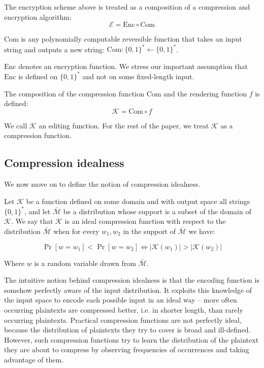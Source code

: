 \documentclass[conference, letterpaper, 10pt]{IEEEtran}
\begin{document}
The encryption scheme above is treated as a composition of a
compression and encryption algorithm:
\begin{equation*}
    \mathcal{E} = \textrm{Enc} \circ \textrm{Com}
\end{equation*}

$\textrm{Com}$ is any polynomially computable reversible function that takes an
input string and outputs a new string: $\textrm{Com}: \{0, 1\}^* \leftarrow \{0,
1\}^*$.

$\textrm{Enc}$ denotes an encryption function. We stress our important
assumption that $\textrm{Enc}$ is defined on $\{0, 1\}^*$ and not on some
fixed-length input.

The composition of the compression function $\textrm{Com}$ and the rendering function $f$
is defined:
\begin{equation*}
    \mathcal{K} = \textrm{Com} \circ f
\end{equation*}

We call $\mathcal{K}$ an editing function. For the rest of the paper, we treat
$\mathcal{K}$ as a compression function.

\subsection{Compression idealness}\label{subsec:com_idealness}

We now move on to define the notion of compression idealness.

Let $\mathcal{K}$ be a function defined on some domain and with output space
all strings $\{0, 1\}^*$, and let $\bar{\mathcal{M}}$ be a distribution whose
support is a subset of the domain of $\mathcal{K}$.  We say that $\mathcal{K}$
is an ideal compression function with respect to the distribution
$\bar{\mathcal{M}}$ when for every $w_1, w_2$ in the support of
$\bar{\mathcal{M}}$ we have:

\begin{equation*}
\Pr[w = w_1] < \Pr[w = w_2] \iff \lvert\mathcal{K}(w_1)\rvert > \lvert\mathcal{K}(w_2)\rvert
\end{equation*}

Where $w$ is a random variable drawn from $\bar{\mathcal{M}}$.

The intuitive notion behind compression idealness is that the encoding
function is somehow perfectly aware of the input distribution. It
exploits this knowledge of the input space to encode each possible
input in an ideal way – more often occurring plaintexts are compressed
better, i.e. in shorter length, than rarely occurring plaintexts.
Practical compression functions are not perfectly ideal, because the
distribution of plaintexts they try to cover is broad and ill-defined.
However, such compression functions try to learn the distribution of
the plaintext they are about to compress by observing frequencies of
occurrences and taking advantage of them.
\end{document}
